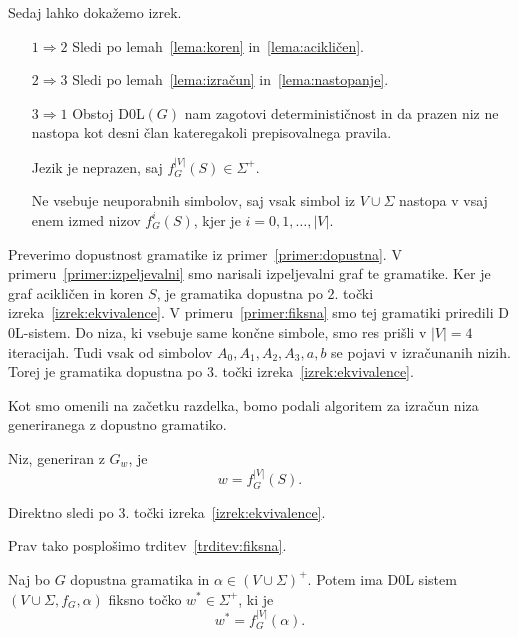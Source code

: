 \documentclass[fin1, tisk]{fmfdelo}
\providecommand{\abs}[1]{\left\lvert #1 \right\rvert}
\theoremstyle{definition}
\begin{document}
Sedaj lahko dokažemo izrek. 

\begin{dokaz}
    \mbox{}
    \begin{itemize}
        \item[$1\Rightarrow 2$] Sledi po lemah~\ref{lema:koren} in~\ref{lema:acikličen}.
        \item[$2\Rightarrow 3$] Sledi po lemah~\ref{lema:izračun} in~\ref{lema:nastopanje}.
        \item[$3\Rightarrow 1$] Obstoj D$0$L$(G)$ nam zagotovi determinističnost in da
        prazen niz ne nastopa kot desni član kateregakoli prepisovalnega pravila. 
        
        Jezik je neprazen, saj $f_G^{\abs{V}}(S) \in \Sigma^+$. 

        Ne vsebuje neuporabnih simbolov, saj vsak simbol iz $V \cup \Sigma$ nastopa v vsaj enem 
        izmed nizov $f_G^i(S)$, kjer je $i=0, 1, \ldots, \abs{V}$.
    \end{itemize}
\end{dokaz}

\begin{primer}
    Preverimo dopustnost gramatike iz primer~\ref{primer:dopustna}. 
    V primeru~\ref{primer:izpeljevalni} smo narisali izpeljevalni graf te gramatike. Ker je graf
    acikličen in koren $S$, je gramatika dopustna po $2.$ točki izreka~\ref{izrek:ekvivalence}.
    V primeru~\ref{primer:fiksna} smo tej gramatiki priredili D$0$L-sistem. Do niza, ki vsebuje 
    same končne simbole, smo res prišli v $\abs{V} = 4$ iteracijah. Tudi vsak od simbolov
    $A_0, A_1, A_2, A_3, a, b$ se pojavi v izračunanih nizih. Torej je gramatika dopustna po
    $3.$ točki izreka~\ref{izrek:ekvivalence}.
\end{primer}

Kot smo omenili na začetku razdelka, bomo podali algoritem za izračun niza generiranega z dopustno
gramatiko.

\begin{posledica}
    Niz, generiran z $G_w$, je 
    \[
        w = f_G^{\abs{V}}(S).
    \]
\end{posledica}

\begin{dokaz}
    Direktno sledi po $3.$ točki izreka~\ref{izrek:ekvivalence}.
\end{dokaz}

Prav tako posplošimo trditev~\ref{trditev:fiksna}.

\begin{posledica}\label{posledica:razširtev}
    Naj bo $G$ dopustna gramatika in $\alpha \in (V \cup \Sigma)^+$. Potem ima D$0$L sistem
    $(V \cup \Sigma, f_G, \alpha)$ fiksno točko $ w^* \in \Sigma^+$, ki je
    \[
        w^* = f_G^{\abs{V}}(\alpha).
    \]
\end{posledica}
\end{document}
